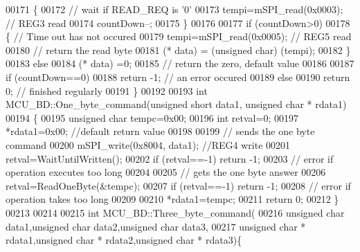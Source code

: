\begin{DoxyCode}
00171     \{
00172         \textcolor{comment}{// wait if READ\_REQ is '0'}
00173         tempi=mSPI\_read(0x0003); \textcolor{comment}{// REG3 read}
00174         countDown--;
00175     \}
00176 
00177     \textcolor{keywordflow}{if} (countDown>0)
00178     \{ \textcolor{comment}{// Time out has not occured}
00179          tempi=mSPI\_read(0x0005); \textcolor{comment}{// REG5 read}
00180           \textcolor{comment}{// return the read byte}
00181          (* data) = (\textcolor{keywordtype}{unsigned} char) (tempi);
00182     \}
00183     \textcolor{keywordflow}{else}
00184         (* data) =0;
00185      \textcolor{comment}{// return the zero, default value}
00186 
00187     \textcolor{keywordflow}{if} (countDown==0)
00188         \textcolor{keywordflow}{return} -1; \textcolor{comment}{// an error occured}
00189     \textcolor{keywordflow}{else}
00190         \textcolor{keywordflow}{return} 0; \textcolor{comment}{// finished regularly}
00191 \}
00192 
00193 \textcolor{keywordtype}{int} MCU\_BD::One\_byte\_command(\textcolor{keywordtype}{unsigned} \textcolor{keywordtype}{short} data1, \textcolor{keywordtype}{unsigned} \textcolor{keywordtype}{char} * rdata1)
00194 \{
00195     \textcolor{keywordtype}{unsigned} \textcolor{keywordtype}{char} tempc=0x00;
00196     \textcolor{keywordtype}{int} retval=0;
00197     *rdata1=0x00; \textcolor{comment}{//default return value}
00198 
00199     \textcolor{comment}{// sends the one byte command}
00200     mSPI\_write(0x8004, data1); \textcolor{comment}{//REG4 write}
00201     retval=WaitUntilWritten();
00202     \textcolor{keywordflow}{if} (retval==-1) \textcolor{keywordflow}{return} -1;
00203     \textcolor{comment}{// error if operation executes too long}
00204 
00205     \textcolor{comment}{// gets the one byte answer}
00206     retval=ReadOneByte(&tempc);
00207     \textcolor{keywordflow}{if} (retval==-1) \textcolor{keywordflow}{return} -1;
00208     \textcolor{comment}{// error if operation takes too long}
00209 
00210     *rdata1=tempc;
00211     \textcolor{keywordflow}{return} 0;
00212 \}
00213 
00214 
00215 \textcolor{keywordtype}{int} MCU\_BD::Three\_byte\_command(
00216         \textcolor{keywordtype}{unsigned} \textcolor{keywordtype}{char} data1,\textcolor{keywordtype}{unsigned} \textcolor{keywordtype}{char} data2,\textcolor{keywordtype}{unsigned} \textcolor{keywordtype}{char} data3,
00217         \textcolor{keywordtype}{unsigned} \textcolor{keywordtype}{char} * rdata1,\textcolor{keywordtype}{unsigned} \textcolor{keywordtype}{char} * rdata2,\textcolor{keywordtype}{unsigned} \textcolor{keywordtype}{char} * rdata3)\{

\end{DoxyCode}

